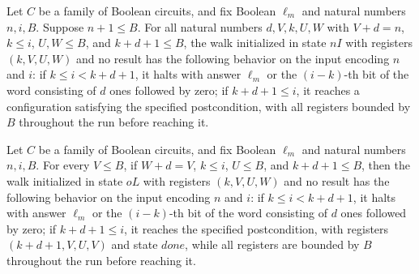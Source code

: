 \begin{lemma}
\label{BoolCircuit.AdjWalk.inLoop}
\leanok
{}
Let $C$ be a family of Boolean circuits, and fix Boolean $\ell_m$ and natural numbers
$n,i,B$. Suppose $n+1\le B$. For all natural numbers $d,V,k,U,W$ with $V+d=n$, $k\le i$,
$U,W\le B$, and $k+d+1\le B$, the walk initialized in state $nI$ with registers
$(k,V,U,W)$ and no result has the following behavior on the input encoding $n$ and $i$:
if $k\le i<k+d+1$, it halts with answer $\ell_m$ or the $(i-k)$-th bit of the word
consisting of $d$ ones followed by zero; if $k+d+1\le i$, it reaches a configuration
satisfying the specified postcondition, with all registers bounded by $B$ throughout the
run before reaching it.
\end{lemma}

\begin{lemma}
\label{BoolCircuit.AdjWalk.oLoop}
\leanok
{}
Let $C$ be a family of Boolean circuits, and fix Boolean $\ell_m$ and natural numbers
$n,i,B$. For every $V\le B$, if $W+d=V$, $k\le i$, $U\le B$, and $k+d+1\le B$, then the
walk initialized in state $oL$ with registers $(k,V,U,W)$ and no result has the
following behavior on the input encoding $n$ and $i$: if $k\le i<k+d+1$, it halts with
answer $\ell_m$ or the $(i-k)$-th bit of the word consisting of $d$ ones followed by
zero; if $k+d+1\le i$, it reaches the specified postcondition, with registers
$(k+d+1,V,U,V)$ and state $done$, while all registers are bounded by $B$ throughout the
run before reaching it.
\end{lemma}

